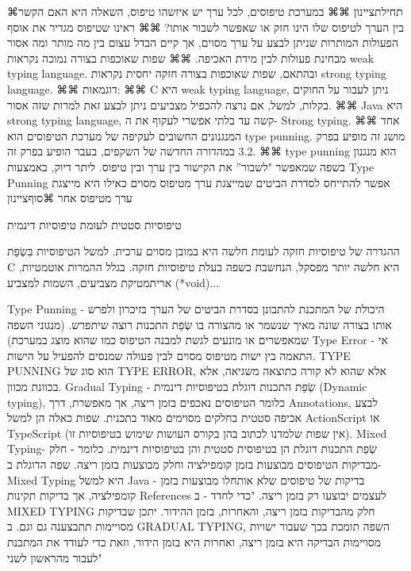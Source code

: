   ⌘תחילת{ציינון}
      ⌘⌘ במערכת טיפוסים, לכל ערך יש איזשהו טיפוס, השאלה היא האם הקשר בין הערך לטיפוס שלו הינו חזק או שאפשר לשבור אותו?
      ⌘⌘ ראינו שטיפוס מגדיר את אוסף הפעולות המותרות שניתן לבצע על ערך מסוים, אך קיים הבדל עצום בין מה מותר ומה אסור מבחינת פעולות לבין מידת האכיפה.
      ⌘⌘ שפות שאוכפות בצורה נמוכה נקראות weak typing language. ובהתאם, שפות שאוכפות בצורה חזקה יחסית נקראות strong typing language.
      ⌘⌘ דוגמאות:
      ⌘⌘ C היא weak typing language, ניתן לעבור על החוקים בקלות, למשל, אם נרצה להכפיל מצביעים ניתן לבצע זאת למרות שזה אסור.
      ⌘⌘ Java היא strong typing language, קשה עד בלתי אפשרי לעקוף את ה- Strong typing.
      ⌘⌘ אחד המנגנונים החשובים לעקיפה של מערכת הטיפוסים הוא type punning. מושג זה מופיע בפרק 3.2 במהדורה החדשה של השקפים, בעבר הופיע בפרק זה.
      ⌘⌘ type punning הוא מנגנון בשפה שמאפשר "לשבור” את הקישור בין ערך ובין טיפוס. ליתר דיוק, באמצעות Type Punning אפשר להתייחס לסדרת הביטים שמייצגת ערך מטיפוס מסוים כאילו היא מייצגת ערך מטיפוס אחר
    ⌘סוף{ציינון}

      טיפוסיות סטטית לעומת טיפוסיות דינמית

      ההגדרה של טיפוסיות חזקה לעומת חלשה היא במובן מסוים ערכית.
      למשל הטיפוסיות בִּשְׂפַת C היא חלשה יותר מפסקל, הנחשבת כשפה בעלת טיפוסיות חזקה.
      בגלל ההמרות אוטמטיות, אריתמטיקת מצביעים, השמות למצביע (*void)...

      Type Punning - היכולת של המתכנת להתבונן בסדרת הביטים של הערך בזיכרון ולפרש אותו בצורה שונה מאיך שנשמר או מהצורה בו שְׂפַת התכנות רוצה שיתפרש.
      (מנגוני השפה שמאפשרים או מונעים לגשת למבנה הטיפוס כמו שהוא מוצג במערכת)
      Type Error - אי התאמה בין ישות מטיפוס מסוים לבין פעולה שמנסים להפעיל על הישות.
      TYPE PUNNING הוא סוג של TYPE ERROR, אלא שהוא לא קורה כתוצאה משגיאה, אלא בכוונת מכוון.
      Gradual Typing - שְׂפַת התכנות דוגלת בטיפוסיות דינמית (Dynamic typing), כלומר הטיפוסים נאכפים בזמן ריצה, אך מאפשרת, דרך Annotations, לבצע אכיפה סטטית בחלקים מסוימים מאוד בתכנית. שפות כאלה הן למשל ActionScript או TypeScript (אין שפות שלמדנו לכתוב בהן בקורס העושות שימוש בטיפוסיות זו).
      Mixed Typing- שְׂפַת התכנות דוגלת הן בטיפוסית סטטית והן בטיפוסיות דינמית. כלומר - חלק מבדיקות הטיפוסים מבוצעות בזמן קומפילציה וחלק מבוצעות בזמן ריצה. שפה הדוגלת ב-Mixed Typing היא למשל Java - בדיקות של טיפוסים שלא אותחלו מבוצעות בזמן קומפילציה, אך בדיקות תקינות References לעצמים יבוצעו רק בזמן ריצה.
      "כדי לחדד - ב MIXED TYPING חלק מהבדיקות בזמן ריצה, והאחרות, בזמן ההידור. יתכן שבדיקות מסויימות תתבצענה גם וגם.
      ב GRADUAL TYPING, השפה תומכת בכך שעבור ישויות מסויימות הבדיקה היא בזמן ריצה, ואחרות היא בזמן הידור, וזאת כדי לעודד את המתכנת לעבור מהראשון לשני"

